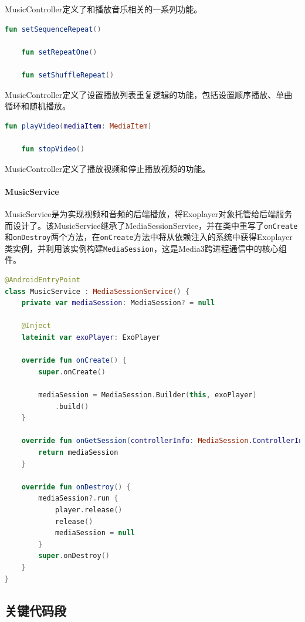 \documentclass[main.tex]{subfiles}
\begin{document}
MusicController定义了和播放音乐相关的一系列功能。

\begin{lstlisting}[language=Kotlin]
    fun setSequenceRepeat()

    fun setRepeatOne()

    fun setShuffleRepeat()
\end{lstlisting}


MusicController定义了设置播放列表重复逻辑的功能，包括设置顺序播放、单曲循环和随机播放。

\begin{lstlisting}[language=Kotlin]
    fun playVideo(mediaItem: MediaItem)

    fun stopVideo()
\end{lstlisting}

MusicController定义了播放视频和停止播放视频的功能。

\paragraph{MusicService}

MusicService是为实现视频和音频的后端播放，将Exoplayer对象托管给后端服务而设计了。该MusicService继承了MediaSessionService，并在类中重写了\texttt{onCreate}和\texttt{onDestroy}两个方法，在\texttt{onCreate}方法中将从依赖注入的系统中获得Exoplayer类实例，并利用该实例构建\texttt{MediaSession}，这是Media3跨进程通信中的核心组件。

\begin{lstlisting}[language=Kotlin]
@AndroidEntryPoint
class MusicService : MediaSessionService() {
    private var mediaSession: MediaSession? = null

    @Inject
    lateinit var exoPlayer: ExoPlayer

    override fun onCreate() {
        super.onCreate()

        mediaSession = MediaSession.Builder(this, exoPlayer)
            .build()
    }

    override fun onGetSession(controllerInfo: MediaSession.ControllerInfo): MediaSession? {
        return mediaSession
    }

    override fun onDestroy() {
        mediaSession?.run {
            player.release()
            release()
            mediaSession = null
        }
        super.onDestroy()
    }
}
\end{lstlisting}

\subsection{关键代码段}
\end{document}
